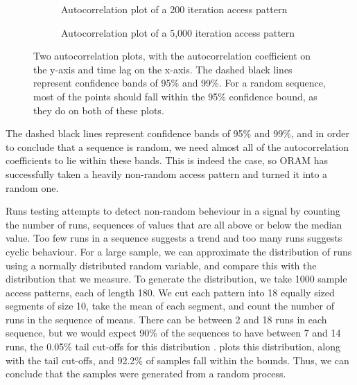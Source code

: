 \documentclass[12pt,a4paper,twoside,openright]{report}
\begin{document}
\begin{figure}
    \centering
    \begin{subfigure}{\textwidth}
        \centering
        
        \caption{Autocorrelation plot of a 200 iteration access pattern}
        \label{fig:shortAutocorr}
    \end{subfigure}
    \begin{subfigure}{\textwidth}
        \centering
        
        \caption{Autocorrelation plot of a 5,000 iteration access pattern}
        \label{fig:longAutocorr}
    \end{subfigure}
    \caption{Two autocorrelation plots, with the autocorrelation coefficient on the y-axis and time lag on the x-axis. The dashed black lines represent confidence bands of 95\% and 99\%. For a random sequence, most of the points should fall within the 95\% confidence bound, as they do on both of these plots.}
    \label{fig:autocorr}
\end{figure}

The dashed black lines represent confidence bands of 95\% and 99\%, and in order to conclude that a sequence is random, we need almost all of the autocorrelation coefficients to lie within these bands. This is indeed the case, so ORAM has successfully taken a heavily non-random access pattern and turned it into a random one.

Runs testing attempts to detect non-random beheviour in a signal by counting the number of runs, sequences of values that are all above or below the median value. Too few runs in a sequence suggests a trend and too many runs suggests cyclic behaviour. For a large sample, we can approximate the distribution of runs using a normally distributed random variable, and compare this with the distribution that we measure. To generate the distribution, we take 1000 sample access patterns, each of length 180. We cut each pattern into 18 equally sized segments of size 10, take the mean of each segment, and count the number of runs in the sequence of means. There can be between 2 and 18 runs in each sequence, but we would expect 90\% of the sequences to have between 7 and 14 runs, the 0.05\% tail cut-offs for this distribution \cite{masliah2000stationarity}.  plots this distribution, along with the tail cut-offs, and 92.2\% of samples fall within the bounds. Thus, we can conclude that the samples were generated from a random process.
\end{document}
